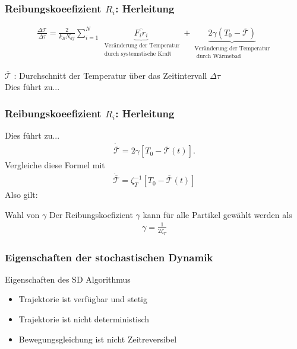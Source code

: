 \documentclass{beamer}
\begin{document}
\begin{frame}
	\frametitle{Reibungskoeefizient $R_i$: Herleitung}
	\begin{align*}
		\frac{\Delta \mathcal{T}}{\Delta \tau} = \frac{2}{k_B N_{df}} \sum\limits_{i=1}^N  \underbrace{\overline{F_i \dot{r}_i} }_ {\substack{\text{ Veränderung der Temperatur} \\ \text{ durch systematische Kraft}} }+\underbrace{ 2 \gamma (T_0 - \overline{\mathcal{T}})  }_{\substack{\text{Veränderung der Temperatur} \\ \text{ durch Wärmebad}}}
	\end{align*} 	
	
	$\overline{\mathcal{T}}$ : Durchschnitt der Temperatur über das Zeitintervall $\Delta \tau$\\
	Dies führt zu...
\end{frame}

\begin{frame} 
	\frametitle{Reibungskoeefizient $R_i$: Herleitung} 
	
	Dies führt zu...
	\begin{align*}
		\dot{ \overline{\mathcal{T}} } = 2 \gamma [T_0 - \overline{\mathcal{T}}(t)]  .
	\end{align*}
	Vergleiche diese Formel mit 
	\begin{align*}
	\dot{ \overline{\mathcal{T}} } = \zeta_T^{-1} [T_0 - \overline{\mathcal{T}}(t)] 
	\end{align*}
	Also gilt:
	\begin{block}{Wahl von $\gamma$}
		Der Reibungskoefizient $\gamma$ kann für alle Partikel gewählt werden als 
		\begin{align*}
			\gamma = \frac{1}{2 \zeta_T}
		\end{align*}
	\end{block}
\end{frame}


\begin{frame} 
	\frametitle{Eigenschaften der stochastischen Dynamik} 
	\begin{block}{Eigenschaften des SD Algorithmus}
		\begin{itemize}
			\item Trajektorie ist verfügbar und stetig
			\item  Trajektorie ist nicht deterministisch
			\item Bewegungsgleichung ist nicht Zeitreversibel
		\end{itemize}
	\end{block}
\end{frame}
	
\end{document}
